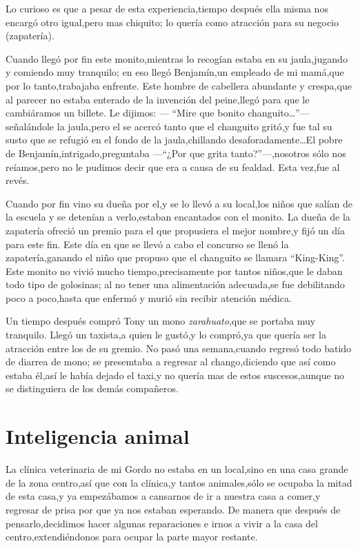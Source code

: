 \documentclass[letterpaper,12pt]{book}
\begin{document}
Lo curioso es que a pesar de esta experiencia,tiempo después ella misma nos encargó otro igual,pero mas chiquito; lo quería como atracción para su negocio (zapatería).

Cuando llegó por fin este monito,mientras lo recogían estaba en su jaula,jugando y comiendo muy tranquilo; en eso llegó Benjamín,un empleado de mi mamá,que por lo tanto,trabajaba enfrente. Este hombre de cabellera abundante y crespa,que al parecer no estaba enterado de la invención del peine,llegó para que le cambiáramos un billete. Le dijimos: --- ``Mire que bonito changuito\ldots''--- señalándole la jaula,pero el se acercó tanto que el changuito gritó,y fue tal su susto que se refugió en el fondo de la jaula,chillando desaforadamente\ldots El pobre de Benjamín,intrigado,preguntaba ---``¿Por que grita tanto?''---,nosotros sólo nos reíamos,pero no le pudimos decir que era a causa de su fealdad. Esta vez,fue al revés.

Cuando por fin vino su dueña por el,y se lo llevó a su local,los niños que salían de la escuela y se detenían a verlo,estaban encantados con el monito. La dueña de la zapatería ofreció un premio para el que propusiera el mejor nombre,y fijó un día para este fin.
Este día en que se llevó a cabo el concurso se llenó la zapatería,ganando el niño que propuso que el changuito se llamara ``King-King''.  Este monito no vivió mucho tiempo,precisamente por tantos niños,que le daban todo tipo de golosinas; al no tener una alimentación adecuada,se fue debilitando poco a poco,hasta que enfermó y murió sin recibir atención médica.

Un tiempo después compró Tony un mono \textit{zarahuato},que se portaba muy tranquilo. Llegó un taxista,a quien le gustó,y lo compró,ya que quería ser la atracción entre los de su gremio. No pasó una semana,cuando regresó todo batido de diarrea de mono; se presemtaba a  regresar al chango,diciendo que así como estaba él,así le había dejado el taxi,y no quería mas de estos suscesos,aunque no se distinguiera de los demás compañeros.
\chapter{Inteligencia animal}
La clínica veterinaria de mi Gordo no estaba en un local,sino en una casa grande de la zona centro,así que con la clínica,y tantos animales,sólo se ocupaba la mitad de esta casa,y ya empezábamos a cansarnos de ir a nuestra casa a comer,y regresar de prisa por que ya nos estaban esperando.
De manera que después de pensarlo,decidimos hacer algunas reparaciones e irnos a vivir a la casa del centro,extendiéndonos para ocupar la parte mayor restante.
\end{document}
